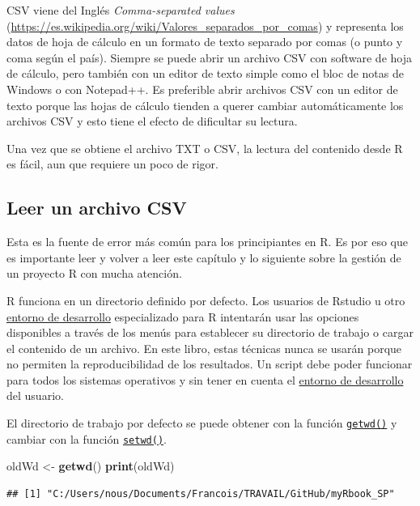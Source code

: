 \documentclass[
]{book}
\newenvironment{Shaded}{\begin{snugshade}}{\end{snugshade}}
\newcommand{\KeywordTok}[1]{\textcolor[rgb]{0.13,0.29,0.53}{\textbf{#1}}}
\newcommand{\NormalTok}[1]{#1}
\newcommand{\StringTok}[1]{\textcolor[rgb]{0.31,0.60,0.02}{#1}}
\begin{document}
CSV viene del Inglés \emph{Comma-separated values} (\url{https://es.wikipedia.org/wiki/Valores_separados_por_comas}) y representa los datos de hoja de cálculo en un formato de texto separado por comas (o punto y coma según el país). Siempre se puede abrir un archivo CSV con software de hoja de cálculo, pero también con un editor de texto simple como el bloc de notas de Windows o con Notepad++. Es preferible abrir archivos CSV con un editor de texto porque las hojas de cálculo tienden a querer cambiar automáticamente los archivos CSV y esto tiene el efecto de dificultar su lectura.

Una vez que se obtiene el archivo TXT o CSV, la lectura del contenido desde R es fácil, aun que requiere un poco de rigor.

\hypertarget{l016readCSV}{%
\subsection{Leer un archivo CSV}\label{l016readCSV}}

Esta es la fuente de error más común para los principiantes en R. Es por eso que es importante leer y volver a leer este capítulo y lo siguiente sobre la gestión de un proyecto R con mucha atención.

R funciona en un directorio definido por defecto. Los usuarios de Rstudio u otro \protect\hyperlink{IDE}{entorno de desarrollo} especializado para R intentarán usar las opciones disponibles a través de los menús para establecer su directorio de trabajo o cargar el contenido de un archivo. En este libro, estas técnicas nunca se usarán porque no permiten la reproducibilidad de los resultados. Un script debe poder funcionar para todos los sistemas operativos y sin tener en cuenta el \protect\hyperlink{IDE}{entorno de desarrollo} del usuario.

El directorio de trabajo por defecto se puede obtener con la función \protect\hyperlink{l015getwd}{\texttt{getwd()}} y cambiar con la función \protect\hyperlink{l015setwd}{\texttt{setwd()}}.

\begin{Shaded}
\begin{Highlighting}[]
\NormalTok{oldWd <-}\StringTok{ }\KeywordTok{getwd}\NormalTok{()}
\KeywordTok{print}\NormalTok{(oldWd)}
\end{Highlighting}
\end{Shaded}

\begin{verbatim}
## [1] "C:/Users/nous/Documents/Francois/TRAVAIL/GitHub/myRbook_SP"
\end{verbatim}
\end{document}
